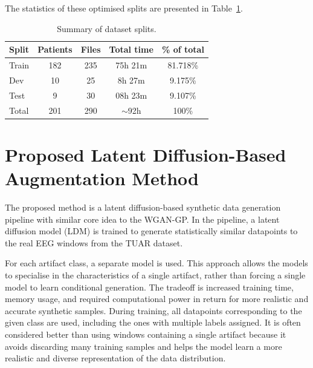 The statistics of these optimised splits are presented in Table~\ref{tab:dataset_splits}.

\begin{table}[h]
\centering
\begin{tabular*}{\textwidth}{@{\extracolsep{\fill}}lcccc}
\toprule
\textbf{Split} & \textbf{Patients} & \textbf{Files} & \textbf{Total time} & \textbf{\% of total} \\
\midrule
Train & 182 & 235 & 75h 21m & 81.718\% \\
Dev   & 10  & 25  & 8h 27m  & 9.175\% \\
Test  & 9   & 30  & 08h 23m & 9.107\% \\
\midrule
Total & 201 & 290 & $\sim$92h & 100\% \\
\bottomrule
\end{tabular*}
\caption{Summary of dataset splits.}
\label{tab:dataset_splits}
\end{table}

\newpage

\section{Proposed  Latent Diffusion-Based Augmentation Method}

The proposed method is a latent diffusion-based synthetic data generation pipeline with similar core idea to the WGAN-GP. In the pipeline, a latent diffusion model (LDM) \cite{rombach2022} is trained to generate statistically similar datapoints to the real EEG windows from the TUAR dataset. 

For each artifact class, a separate model is used. This approach allows the models to specialise in the characteristics of a single artifact, rather than forcing a single model to learn conditional generation. The tradeoff is increased training time, memory usage, and required computational power in return for more realistic and accurate synthetic samples. During training, all datapoints corresponding to the given class are used, including the ones with multiple labels assigned. It is often considered better than using windows containing a single artifact because it avoids discarding many training samples and helps the model learn a more realistic and diverse representation of the data distribution.

